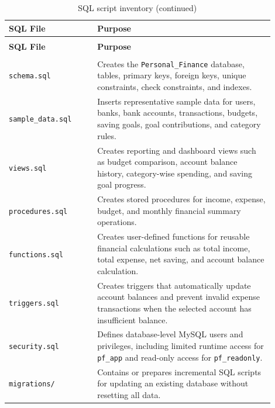 ﻿\documentclass{article}
\begin{document}
\begin{longtable}{
    >{\raggedright\arraybackslash}p{0.30\linewidth}
    J{0.60\linewidth}
}
\caption{SQL script inventory}
\label{tab:sql-script-inventory} \\

\toprule
\textbf{SQL File} & \textbf{Purpose} \\
\midrule
\endfirsthead

\caption[]{SQL script inventory (continued)} \\

\toprule
\textbf{SQL File} & \textbf{Purpose} \\
\midrule
\endhead

\midrule
{} \\
\endfoot

\bottomrule
\endlastfoot

\texttt{schema.sql} 
& Creates the \texttt{Personal\_Finance} database, tables, primary keys, foreign keys, unique constraints, check constraints, and indexes. \\

\texttt{sample\_data.sql} 
& Inserts representative sample data for users, banks, bank accounts, transactions, budgets, saving goals, goal contributions, and category rules. \\

\texttt{views.sql} 
& Creates reporting and dashboard views such as budget comparison, account balance history, category-wise spending, and saving goal progress. \\

\texttt{procedures.sql} 
& Creates stored procedures for income, expense, budget, and monthly financial summary operations. \\

\texttt{functions.sql} 
& Creates user-defined functions for reusable financial calculations such as total income, total expense, net saving, and account balance calculation. \\

\texttt{triggers.sql} 
& Creates triggers that automatically update account balances and prevent invalid expense transactions when the selected account has insufficient balance. \\

\texttt{security.sql} 
& Defines database-level MySQL users and privileges, including limited runtime access for \texttt{pf\_app} and read-only access for \texttt{pf\_readonly}. \\

\texttt{migrations/} 
& Contains or prepares incremental SQL scripts for updating an existing database without resetting all data. \\

\end{longtable}
\normalsize
\end{document}
